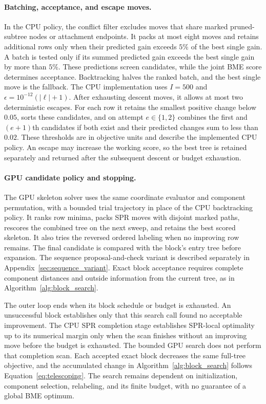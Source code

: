\documentclass[11pt,a4paper]{article}
\makeatletter
\DeclareRobustCommand{\_}{\ifmmode\nfss@text{\textunderscore}\else\textunderscore\allowbreak\fi}
\theoremstyle{definition}
\makeatother
\begin{document}
\paragraph{Batching, acceptance, and escape moves.}
In the CPU policy, the conflict filter excludes moves that share marked pruned-subtree nodes or attachment endpoints.
It packs at most eight moves and retains additional rows only when their predicted gain exceeds $5\%$ of the best single gain.
A batch is tested only if its summed predicted gain exceeds the best single gain by more than $5\%$.
These predictions screen candidates, while the joint BME score determines acceptance.
Backtracking halves the ranked batch, and the best single move is the fallback.
The CPU implementation uses $I=500$ and $\epsilon=10^{-12}(|\ell|+1)$.
After exhausting descent moves, it allows at most two deterministic escapes.
For each row it retains the smallest positive change below $0.05$, sorts these candidates, and on attempt $e\in\{1,2\}$ combines the first and $(e+1)$th candidates if both exist and their predicted changes sum to less than $0.02$.
These thresholds are in objective units and describe the implemented CPU policy.
An escape may increase the working score, so the best tree is retained separately and returned after the subsequent descent or budget exhaustion.

\paragraph{GPU candidate policy and stopping.}
The GPU skeleton solver uses the same coordinate evaluator and component permutation, with a bounded trial trajectory in place of the CPU backtracking policy.
It ranks row minima, packs SPR moves with disjoint marked paths, rescores the combined tree on the next sweep, and retains the best scored skeleton.
It also tries the reversed ordered labeling when no improving row remains.
The final candidate is compared with the block's entry tree before expansion.
The sequence proposal-and-check variant is described separately in Appendix~\ref{sec:sequence_variant}.
Exact block acceptance requires complete component distances and outside information from the current tree, as in Algorithm~\ref{alg:block_search}.

The outer loop ends when its block schedule or budget is exhausted.
An unsuccessful block establishes only that this search call found no acceptable improvement.
The CPU SPR completion stage establishes SPR-local optimality up to its numerical margin only when the scan finishes without an improving move before the budget is exhausted.
The bounded GPU search does not perform that completion scan.
Each accepted exact block decreases the same full-tree objective, and the accumulated change in Algorithm~\ref{alg:block_search} follows Equation~\eqref{eq:telescoping}.
The search remains dependent on initialization, component selection, relabeling, and its finite budget, with no guarantee of a global BME optimum.
\end{document}
